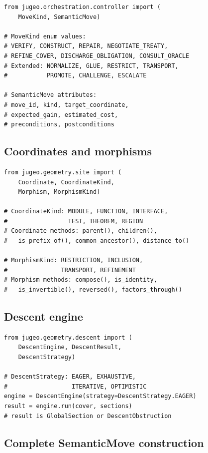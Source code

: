 \documentclass[11pt]{article}
\begin{document}
\begin{lstlisting}[caption={MoveKind and SemanticMove.},label=lst:movekind]
from jugeo.orchestration.controller import (
    MoveKind, SemanticMove)

# MoveKind enum values:
# VERIFY, CONSTRUCT, REPAIR, NEGOTIATE_TREATY,
# REFINE_COVER, DISCHARGE_OBLIGATION, CONSULT_ORACLE
# Extended: NORMALIZE, GLUE, RESTRICT, TRANSPORT,
#           PROMOTE, CHALLENGE, ESCALATE

# SemanticMove attributes:
# move_id, kind, target_coordinate,
# expected_gain, estimated_cost,
# preconditions, postconditions
\end{lstlisting}

\subsection{Coordinates and morphisms}

\begin{lstlisting}[caption={Coordinate and Morphism API.},
                   label=lst:coord-morph]
from jugeo.geometry.site import (
    Coordinate, CoordinateKind,
    Morphism, MorphismKind)

# CoordinateKind: MODULE, FUNCTION, INTERFACE,
#                 TEST, THEOREM, REGION
# Coordinate methods: parent(), children(),
#   is_prefix_of(), common_ancestor(), distance_to()

# MorphismKind: RESTRICTION, INCLUSION,
#               TRANSPORT, REFINEMENT
# Morphism methods: compose(), is_identity,
#   is_invertible(), reversed(), factors_through()
\end{lstlisting}

\subsection{Descent engine}

\begin{lstlisting}[caption={DescentEngine API.},label=lst:descent]
from jugeo.geometry.descent import (
    DescentEngine, DescentResult,
    DescentStrategy)

# DescentStrategy: EAGER, EXHAUSTIVE,
#                  ITERATIVE, OPTIMISTIC
engine = DescentEngine(strategy=DescentStrategy.EAGER)
result = engine.run(cover, sections)
# result is GlobalSection or DescentObstruction
\end{lstlisting}

\subsection{Complete SemanticMove construction}\label{sec:api-sm-example}
\end{document}
